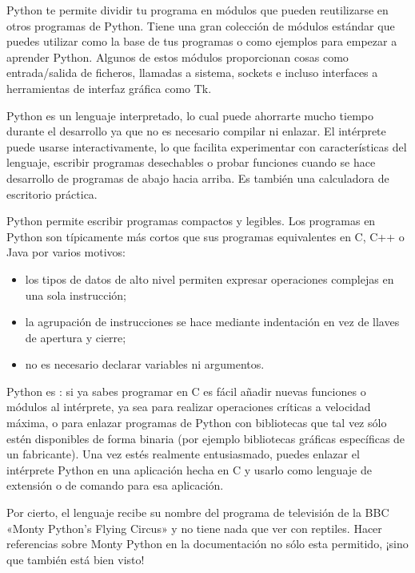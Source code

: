 \documentclass[a5paper,10pt,spanish]{sphinxmanual}
\begin{document}
\sphinxAtStartPar
Python te permite dividir tu programa en módulos que pueden reutilizarse en otros programas de Python. Tiene una gran colección de módulos estándar que puedes utilizar como la base de tus programas o como ejemplos para empezar a aprender Python. Algunos de estos módulos proporcionan cosas como entrada/salida de ficheros, llamadas a sistema, sockets e incluso interfaces a herramientas de interfaz gráfica como Tk.

\sphinxAtStartPar
Python es un lenguaje interpretado, lo cual puede ahorrarte mucho tiempo durante el desarrollo ya que no es necesario compilar ni enlazar. El intérprete puede usarse interactivamente, lo que facilita experimentar con características del lenguaje, escribir programas desechables o probar funciones cuando se hace desarrollo de programas de abajo hacia arriba. Es también una calculadora de escritorio práctica.

\sphinxAtStartPar
Python permite escribir programas compactos y legibles. Los programas en Python son típicamente más cortos que sus programas equivalentes en C, C++ o Java por varios motivos:
\begin{itemize}
\item {} 
\sphinxAtStartPar
los tipos de datos de alto nivel permiten expresar operaciones complejas en una sola instrucción;

\item {} 
\sphinxAtStartPar
la agrupación de instrucciones se hace mediante indentación en vez de llaves de apertura y cierre;

\item {} 
\sphinxAtStartPar
no es necesario declarar variables ni argumentos.

\end{itemize}

\sphinxAtStartPar
Python es : si ya sabes programar en C es fácil añadir nuevas funciones o módulos al intérprete, ya sea para realizar operaciones críticas a velocidad máxima, o para enlazar programas de Python con bibliotecas que tal vez sólo estén disponibles de forma binaria (por ejemplo bibliotecas gráficas específicas de un fabricante). Una vez estés realmente entusiasmado, puedes enlazar el intérprete Python en una aplicación hecha en C y usarlo como lenguaje de extensión o de comando para esa aplicación.

\sphinxAtStartPar
Por cierto, el lenguaje recibe su nombre del programa de televisión de la BBC «Monty Python’s Flying Circus» y no tiene nada que ver con reptiles. Hacer referencias sobre Monty Python en la documentación no sólo esta permitido, ¡sino que también está bien visto!
\end{document}
